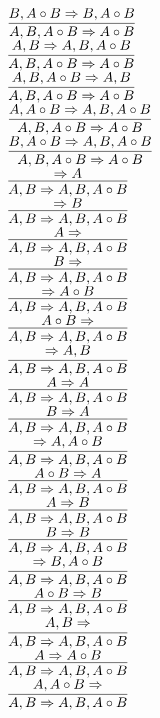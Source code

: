 \documentclass[11pt]{article}
\begin{document}
\begin{center}
\bigskip
\\$\infer{A, B, A\circ B\Rightarrow A\circ B}{B, A\circ B\Rightarrow B, A\circ B}$
\bigskip
\\$\infer{A, B, A\circ B\Rightarrow A\circ B}{A, B\Rightarrow A, B, A\circ B}$
\bigskip
\\$\infer{A, B, A\circ B\Rightarrow A\circ B}{A, B, A\circ B\Rightarrow A, B}$
\bigskip
\\$\infer{A, B, A\circ B\Rightarrow A\circ B}{A, A\circ B\Rightarrow A, B, A\circ B}$
\bigskip
\\$\infer{A, B, A\circ B\Rightarrow A\circ B}{B, A\circ B\Rightarrow A, B, A\circ B}$
\bigskip
\\$\infer{A, B\Rightarrow A, B, A\circ B}{\Rightarrow A}$
\bigskip
\\$\infer{A, B\Rightarrow A, B, A\circ B}{\Rightarrow B}$
\bigskip
\\$\infer{A, B\Rightarrow A, B, A\circ B}{A\Rightarrow }$
\bigskip
\\$\infer{A, B\Rightarrow A, B, A\circ B}{B\Rightarrow }$
\bigskip
\\$\infer{A, B\Rightarrow A, B, A\circ B}{\Rightarrow A\circ B}$
\bigskip
\\$\infer{A, B\Rightarrow A, B, A\circ B}{A\circ B\Rightarrow }$
\bigskip
\\$\infer{A, B\Rightarrow A, B, A\circ B}{\Rightarrow A, B}$
\bigskip
\\$\infer{A, B\Rightarrow A, B, A\circ B}{A\Rightarrow A}$
\bigskip
\\$\infer{A, B\Rightarrow A, B, A\circ B}{B\Rightarrow A}$
\bigskip
\\$\infer{A, B\Rightarrow A, B, A\circ B}{\Rightarrow A, A\circ B}$
\bigskip
\\$\infer{A, B\Rightarrow A, B, A\circ B}{A\circ B\Rightarrow A}$
\bigskip
\\$\infer{A, B\Rightarrow A, B, A\circ B}{A\Rightarrow B}$
\bigskip
\\$\infer{A, B\Rightarrow A, B, A\circ B}{B\Rightarrow B}$
\bigskip
\\$\infer{A, B\Rightarrow A, B, A\circ B}{\Rightarrow B, A\circ B}$
\bigskip
\\$\infer{A, B\Rightarrow A, B, A\circ B}{A\circ B\Rightarrow B}$
\bigskip
\\$\infer{A, B\Rightarrow A, B, A\circ B}{A, B\Rightarrow }$
\bigskip
\\$\infer{A, B\Rightarrow A, B, A\circ B}{A\Rightarrow A\circ B}$
\bigskip
\\$\infer{A, B\Rightarrow A, B, A\circ B}{A, A\circ B\Rightarrow }$

\end{center}
\end{document}
